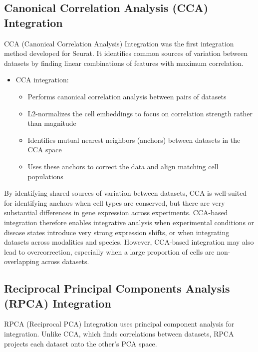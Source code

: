 \documentclass[
  letterpaper,
  DIV=11,
  numbers=noendperiod]{scrreprt}
\providecommand{\tightlist}{%
  \setlength{\itemsep}{0pt}\setlength{\parskip}{0pt}}
\begin{document}
\subsection{Canonical Correlation Analysis (CCA)
Integration}\label{canonical-correlation-analysis-cca-integration}

CCA (Canonical Correlation Analysis) Integration was the first
integration method developed for Seurat. It identifies common sources of
variation between datasets by finding linear combinations of features
with maximum correlation.

\begin{itemize}
\item
  CCA integration:

  \begin{itemize}
  \tightlist
  \item
    Performs canonical correlation analysis between pairs of datasets
  \item
    L2-normalizes the cell embeddings to focus on correlation strength
    rather than magnitude
  \item
    Identifies mutual nearest neighbors (anchors) between datasets in
    the CCA space
  \item
    Uses these anchors to correct the data and align matching cell
    populations
  \end{itemize}
\end{itemize}

By identifying shared sources of variation between datasets, CCA is
well-suited for identifying anchors when cell types are conserved, but
there are very substantial differences in gene expression across
experiments. CCA-based integration therefore enables integrative
analysis when experimental conditions or disease states introduce very
strong expression shifts, or when integrating datasets across modalities
and species. However, CCA-based integration may also lead to
overcorrection, especially when a large proportion of cells are
non-overlapping across datasets.

\subsection{Reciprocal Principal Components Analysis (RPCA)
Integration}\label{reciprocal-principal-components-analysis-rpca-integration}

RPCA (Reciprocal PCA) Integration uses principal component analysis for
integration. Unlike CCA, which finds correlations between datasets, RPCA
projects each dataset onto the other's PCA space.
\end{document}

